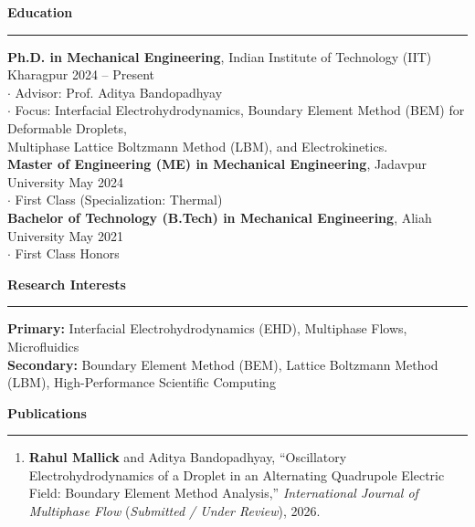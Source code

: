 \documentclass[10pt,letterpaper]{article}
\begin{document}
\noindent\textbf{\large Education}
\vspace{2pt}
\hrule
\vspace{4pt}
\noindent\textbf{Ph.D. in Mechanical Engineering}, Indian Institute of Technology (IIT) Kharagpur \hfill 2024 -- Present\\
\hspace*{1em}$\cdot$ Advisor: Prof. Aditya Bandopadhyay\\
\hspace*{1em}$\cdot$ Focus: Interfacial Electrohydrodynamics, Boundary Element Method (BEM) for Deformable Droplets,\\
\hspace*{1.8em}Multiphase Lattice Boltzmann Method (LBM), and Electrokinetics.\\[2pt]
\noindent\textbf{Master of Engineering (ME) in Mechanical Engineering}, Jadavpur University \hfill May 2024\\
\hspace*{1em}$\cdot$ First Class (Specialization: Thermal)\\[2pt]
\noindent\textbf{Bachelor of Technology (B.Tech) in Mechanical Engineering}, Aliah University \hfill May 2021\\
\hspace*{1em}$\cdot$ First Class Honors

\medskip

\noindent\textbf{\large Research Interests}
\vspace{2pt}
\hrule
\vspace{4pt}
\noindent\textbf{Primary:} Interfacial Electrohydrodynamics (EHD), Multiphase Flows, Microfluidics\\
\noindent\textbf{Secondary:} Boundary Element Method (BEM), Lattice Boltzmann Method (LBM), High-Performance Scientific Computing

\medskip

\noindent\textbf{\large Publications}
\vspace{2pt}
\hrule
\vspace{4pt}
\begin{enumerate}[leftmargin=1.8em, itemsep=2pt]
\item \textbf{Rahul Mallick} and Aditya Bandopadhyay, ``Oscillatory Electrohydrodynamics of a Droplet in an Alternating Quadrupole Electric Field: Boundary Element Method Analysis,'' \textit{International Journal of Multiphase Flow} (\textit{Submitted / Under Review}), 2026.
\end{enumerate}
\end{document}
